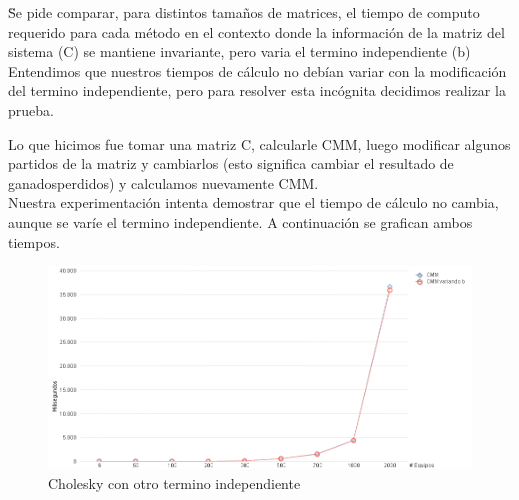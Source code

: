 \"Se pide comparar, para distintos tamaños de matrices, el tiempo de computo requerido para cada método en el contexto donde la información de la matriz del sistema (C) se mantiene invariante,
pero varia el termino independiente (b)\"\\

Entendimos que nuestros tiempos de cálculo no debían variar con la modificación del termino independiente, pero para resolver esta incógnita decidimos realizar la prueba.

Lo que hicimos fue tomar una matriz C, calcularle CMM, luego modificar algunos partidos de la matriz y cambiarlos (esto significa cambiar el resultado de ganados\/perdidos) y calculamos
nuevamente CMM. \\

Nuestra experimentación intenta demostrar que el tiempo de cálculo no cambia, aunque se varíe el termino independiente.
A continuación se grafican ambos tiempos.\\

\begin{figure}[H]
    \centering
    \includegraphics[width=1\textwidth]{IMG/Cholesky con otro termino independiente.png}
    \caption{Cholesky con otro termino independiente}
    \label{fig:Cholesky con otro termino independiente}
\end{figure}


